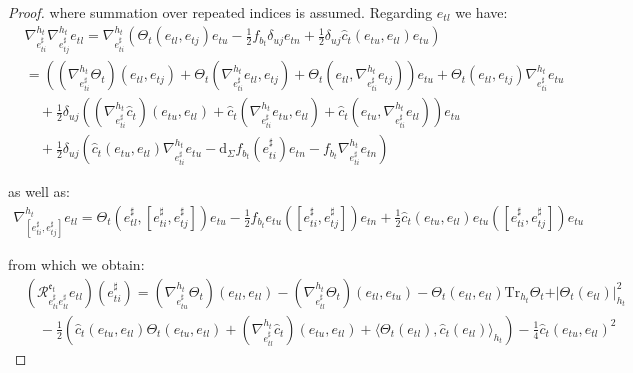 \documentclass[10pt,reqno,a4paper]{amsart}
\theoremstyle{plain}
\theoremstyle{definition}
\theoremstyle{remark}
\theoremstyle{remark}
\def\dd{\mathrm{d}}
\newcommand{\Tr}{\mathrm{Tr}}
\def\cR{{\mathcal R}}
\def\fre{\mathfrak{e}}
\renewcommand{\(}{ (}
\renewcommand{\)}{ )}
\begin{document}
\begin{proof}
\noindent
where summation over repeated indices is assumed. Regarding $e_{tl}$ we have:
\begin{eqnarray*}
& \nabla^{h_t}_{e^{\sharp}_{ti}}\nabla^{h_t}_{e_{tj}^{\sharp}}e_{tl}=\nabla^{h_t}_{e^{\sharp}_{ti}}(\Theta_t(e_{tl},e_{tj})e_{tu}-\frac{1}{2}f_{b_t}\delta_{uj}e_{tn}+\frac{1}{2}\delta_{uj}\widehat{c}_t (e_{tu},e_{tl})e_{tu})\\
&=((\nabla^{h_t}_{e^{\sharp}_{ti}}\Theta_t)(e_{tl},e_{tj})+\Theta_t(\nabla^{h_t}_{e^{\sharp}_{ti}}e_{tl},e_{tj})+\Theta_t(e_{tl},\nabla^{h_t}_{e^{\sharp}_{ti}}e_{tj}))e_{tu}+\Theta_t(e_{tl},e_{tj})\nabla^{h_t}_{e^{\sharp}_{ti}}e_{tu}\\
&\quad+\frac{1}{2}\delta_{uj}((\nabla^{h_t}_{e^{\sharp}_{ti}}\widehat{c}_t )(e_{tu},e_{tl})+\widehat{c}_t (\nabla^{h_t}_{e^{\sharp}_{ti}}e_{tu},e_{tl})+\widehat{c}_t (e_{tu},\nabla^{h_t}_{e^{\sharp}_{ti}}e_{tl}))e_{tu}\\
&\quad+\frac{1}{2}\delta_{uj}(\widehat{c}_t (e_{tu},e_{tl})\nabla^{h_t}_{e^{\sharp}_{ti}}e_{tu}-\dd_{\Sigma}f_{b_t}(e^{\sharp}_{ti})e_{tn}-f_{b_t}\nabla^{h_t}_{e^{\sharp}_{ti}}e_{tn})
\end{eqnarray*}
 
\noindent
as well as:
\begin{eqnarray*}
\nabla^{h_t}_{[e^{\sharp}_{ti},e_{tj}^{\sharp}]}e_{tl}=\Theta_t(e^{\sharp}_{tl},[e^{\sharp}_{ti},e_{tj}^{\sharp}])e_{tu}-\frac{1}{2}f_{b_t}e_{tu}([e^{\sharp}_{ti},e_{tj}^{\sharp}])e_{tn}+\frac{1}{2}\widehat{c}_t (e_{tu},e_{tl})e_{tu}([e^{\sharp}_{ti},e_{tj}^{\sharp}])e_{tu}
\end{eqnarray*}

\noindent
from which we obtain:
\begin{eqnarray*}
& (\cR^{\fre_t}_{e^{\sharp}_{ti} e^{\sharp}_{tl}}e_{tl})(e^{\sharp}_{ti})=(\nabla^{h_t}_{e^{\sharp}_{tu}}\Theta_t)(e_{tl},e_{tl})-(\nabla^{h_t}_{e^{\sharp}_{tl}}\Theta_t)(e_{tl},e_{tu})-\Theta_t(e_{tl},e_{tl})\Tr_{h_t}\Theta_t+\vert\Theta_t(e_{tl})\vert^2_{h_t}\\
&\quad-\frac{1}{2}(\widehat{c}_t (e_{tu},e_{tl})\Theta_t(e_{tu},e_{tl})+(\nabla^{h_t}_{e^{\sharp}_{tl}}\widehat{c}_t )(e_{tu},e_{tl})+\langle\Theta_t(e_{tl}),\widehat{c}_t (e_{tl})\rangle_{h_t})-\frac{1}{4}\widehat{c}_t (e_{tu},e_{tl})^2
\end{eqnarray*}


\end{proof}
\end{document}
